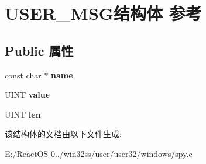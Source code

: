 \hypertarget{struct_u_s_e_r___m_s_g}{}\section{U\+S\+E\+R\+\_\+\+M\+S\+G结构体 参考}
\label{struct_u_s_e_r___m_s_g}
\subsection*{Public 属性}
\begin{DoxyCompactItemize}
\item 
\mbox{\label{struct_u_s_e_r___m_s_g_a6034783f3a56841a48c6fb61de656db9}} 
const char $\ast$ {\bfseries name}
\item 
\mbox{\label{struct_u_s_e_r___m_s_g_af9c2c6bd3c4602cc9245f37c4abdf892}} 
U\+I\+NT {\bfseries value}
\item 
\mbox{\label{struct_u_s_e_r___m_s_g_a48bdcaca3b194618ffe02e0c73667660}} 
U\+I\+NT {\bfseries len}
\end{DoxyCompactItemize}


该结构体的文档由以下文件生成\+:\begin{DoxyCompactItemize}
\item 
E\+:/\+React\+O\+S-\/0../win32ss/user/user32/windows/spy.\+c\end{DoxyCompactItemize}
